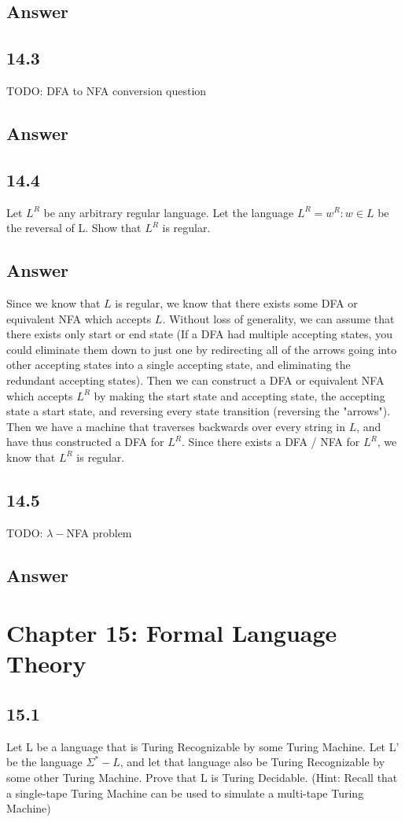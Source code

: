 \documentclass{article}
\begin{document}
\subsection*{Answer}
\newpage
\subsection*{14.3}
TODO: DFA to NFA conversion question
\subsection*{Answer}
\newpage
\subsection{14.4}
Let $L^R$ be any arbitrary regular language. Let the language $L^R = {w^R : w \in L}$ be the reversal of L.
Show that $L^R$ is regular.
\subsection*{Answer}

Since we know that $L$ is regular, we know that there exists some DFA or equivalent NFA which accepts $L$. Without loss of generality, we can
assume that there exists only start or end state (If a DFA had multiple accepting states, you could eliminate them down to just one 
by redirecting all of the arrows going into other accepting states into a single accepting state, and eliminating the redundant accepting
states). Then we can construct a DFA or equivalent NFA which accepts $L^R$ by making the start state and accepting state, the accepting state
a start state, and reversing every state transition (reversing the "arrows"). Then we have a machine that traverses backwards over every
string in $L$, and have thus constructed a DFA for $L^R$. Since there exists a DFA / NFA for $L^R$, we know that $L^R$ is regular.
\newpage
\subsection*{14.5}
TODO: $\lambda-$NFA problem
\subsection*{Answer}
\newpage
\section*{Chapter 15: Formal Language Theory}
\subsection*{15.1}
Let L be a language that is Turing Recognizable by some Turing Machine. Let L' be the language $\Sigma^* - L$,
and let that language also be Turing Recognizable by some other Turing Machine. Prove that L is Turing Decidable.
(Hint: Recall that a single-tape Turing Machine can be used to simulate a multi-tape Turing Machine)
\end{document}
